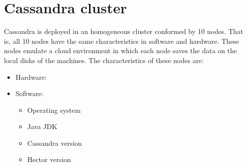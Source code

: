 % 	
% 			
% 			


\section{Cassandra cluster} \label{sexp:CassandraCluster}
Cassandra is deployed in an homogeneous cluster conformed by 10 nodes. That is,
 all 10 nodes have the same characteristics in software and hardware. These
 nodes emulate a cloud environment in which each node saves
 the data on the local disks of the machines. The characteristics of these nodes
are:


\begin{itemize}
  \item Hardware: 
  	\begin{itemize}
  	  
  	 \end{itemize}
  \item Software: 
  \begin{itemize}
    \item Operating system
    \item Java JDK
    \item Cassandra version
    \item Hector version
  \end{itemize}
\end{itemize}

